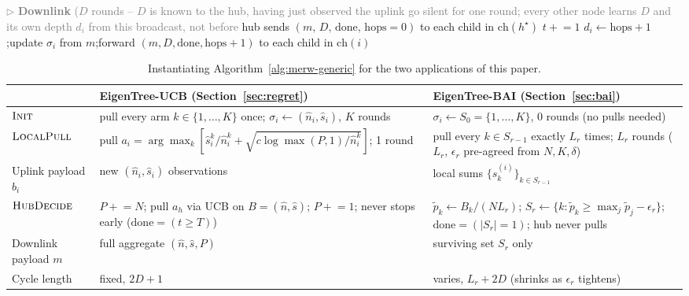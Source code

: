 \documentclass{article}
\newcommand{\merw}{EigenTree}
\begin{document}
\begin{algorithm}[H]
\begin{algorithmic}[1]
    \State \textcolor{gray}{$\triangleright$ \textbf{Downlink} ($D$ rounds -- $D$ is known to the hub, having just observed the uplink go silent for one round; every other node learns $D$ and its own depth $d_i$ from this broadcast, not before}
    \State hub sends $(m,\, D,\, \mathrm{done},\, \mathrm{hops}{=}0)$ to each child in $\mathrm{ch}(h^\star)$ 
    \Repeat
        \State $t \mathrel{+}= 1$
                \State $d_i \leftarrow \mathrm{hops} + 1$;\quad update $\sigma_i$ from $m$;\quad forward $(m, D, \mathrm{done}, \mathrm{hops}{+}1)$ to each child in $\mathrm{ch}(i)$ 
            \EndIf
        \EndFor
     
\end{algorithmic}
\end{algorithm}

\begin{table}[H]
\centering
\caption{Instantiating Algorithm~\ref{alg:merw-generic} for the two applications of this paper.}
\label{tab:instantiations}
\begin{tabular}{p{}p{}p{}}
\toprule
 & \merw-UCB (Section~\ref{sec:regret}) & \merw-BAI (Section~\ref{sec:bai}) \\
\midrule
$\textsc{Init}$ & pull every arm $k \in \{1,\ldots,K\}$ once; $\sigma_i \leftarrow (\hat n_i, \hat s_i)$, $K$ rounds & $\sigma_i \leftarrow S_0 = \{1,\ldots,K\}$, 0 rounds (no pulls needed) \\
$\textsc{LocalPull}$ & pull $a_i = \arg\max_k[\hat s_i^k/\hat n_i^k + \sqrt{c\log \max(P,1)/\hat n_i^k}]$; 1 round & pull every $k \in S_{r-1}$ exactly $L_r$ times; $L_r$ rounds ($L_r$, $\epsilon_r$ pre-agreed from $N,K,\delta$) \\
Uplink payload $b_i$ & new $(\hat n_i, \hat s_i)$ observations & local sums $\{s_k^{(i)}\}_{k \in S_{r-1}}$ \\
$\textsc{HubDecide}$ & $P \mathrel{+}= N$; pull $a_h$ via UCB on $B=(\hat n,\hat s)$; $P\mathrel{+}=1$; never stops early ($\mathrm{done} = (t \geq T)$) & $\tilde p_k \leftarrow B_k/(N L_r)$; $S_r \leftarrow \{k : \tilde p_k \geq \max_j \tilde p_j - \epsilon_r\}$; $\mathrm{done} = (|S_r|=1)$; hub never pulls \\
Downlink payload $m$ & full aggregate $(\hat n, \hat s, P)$ & surviving set $S_r$ only \\
Cycle length & fixed, $2D+1$ & varies, $L_r + 2D$ (shrinks as $\epsilon_r$ tightens) \\
\bottomrule
\end{tabular}
\end{table}
\end{document}
